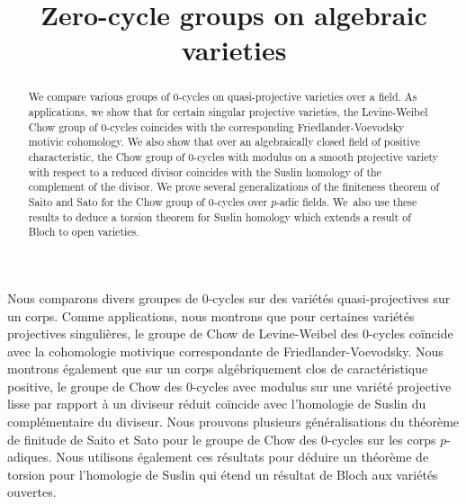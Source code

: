 \documentclass[JEP,XML,SOM,Unicode,published]{cedram}
\theoremstyle{definition}
\begin{document}
\frontmatter
\title{Zero-cycle groups on algebraic varieties}

\author[\initial{F.} \lastname{Binda}]{ }
\address{Dipartimento di Matematica ``Federigo Enriques'', Università degli Studi di Milano\\
Via Cesare Saldini 50, 20133 Milano, Italy}

\author[\initial{A.} \lastname{Krishna}]{ }
\address{Department of Mathematics, Indian Institute of Science\\
Bangalore, 560012, India}
\urladdr{}



\begin{abstract}
We compare various groups of $0$-cycles on quasi-projective varieties over a field. As applications, we show that for certain singular projective varieties, the Levine-Weibel Chow group of $0$-cycles coincides with the corresponding Friedlander-Voevodsky motivic cohomology. We also show that over an algebraically closed field of positive characteristic, the Chow group of $0$-cycles with modulus on a smooth projective variety with respect to a reduced divisor coincides with the Suslin homology of the complement of the divisor. We prove several generalizations of the finiteness theorem of Saito and Sato for the Chow group of $0$-cycles over $p$-adic fields. We~also use these results to deduce a torsion theorem for Suslin homology which extends a result of Bloch to open varieties.
\end{abstract}



\begin{altabstract}
Nous comparons divers groupes de $0$-cycles sur des variétés quasi-projectives sur un corps. Comme applications, nous montrons que pour certaines variétés projectives singulières, le groupe de Chow de Levine-Weibel des $0$-cycles coïncide avec la cohomologie motivique correspondante de Friedlander-Voevodsky. Nous montrons également que sur un corps algébriquement clos de caractéristique positive, le groupe de Chow des $0$-cycles avec modulus sur une variété projective lisse par rapport à un diviseur réduit coïncide avec l'homologie de Suslin du complémentaire du diviseur. Nous prouvons plusieurs généralisations du théorème de finitude de Saito et Sato pour le groupe de Chow des $0$-cycles sur les corps $p$-adiques. Nous utilisons également ces résultats pour déduire un théorème de torsion pour l'homologie de Suslin qui étend un résultat de Bloch aux variétés ouvertes.
\end{altabstract}
\end{document}
